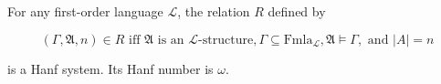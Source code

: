 For any first-order language $\mathcal{L}$, the relation $R$ defined by

$$(\Gamma, \mathfrak{A}, n) \in R \text{ iff } \mathfrak{A} \text{ is an } \mathcal{L}\text{-structure}, \Gamma \subseteq \mathrm{Fmla}_{\mathcal{L}}, \mathfrak{A} \models \Gamma, \text{ and } |A| = n$$

is a Hanf system. Its Hanf number is $\omega$.
